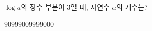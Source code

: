 $\log a$의 정수 부분이 $3$일 때, 자연수 $a$의 개수는?
\begin{choices32}{$90$}{$99$}{$900$}{$999$}{$9000$}\end{choices32}
